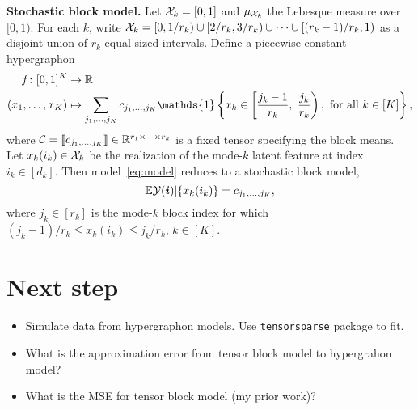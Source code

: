 \documentclass[11pt]{article}
\theoremstyle{plain}
\theoremstyle{definition}
\begin{document}
{\bf Stochastic block model.} Let $\mathcal{X}_k=[0,1]$ and $\mu_{\mathcal{X}_k}$ the Lebesque measure over $[0,1)$. For each $k$, write $\mathcal{X}_k=[0,1/r_k)\cup [2/r_k, 3/r_k) \cup \cdots \cup [(r_k-1)/r_k, 1)$ as a disjoint union of $r_k$ equal-sized intervals. Define a piecewise constant hypergraphon
\begin{align}\label{eq:block}
f\colon [0,1]^K &\to \mathbb{R}\\
(x_1,\ldots,x_K) &\mapsto \sum_{j_1,\ldots,j_K} c_{j_1,\ldots,j_K} \mathds{1}\left\{x_k\in \left[{j_k-1\over r_k},\ {j_k\over r_k}\right),\ \text{for all }k\in[K]\right\},
\end{align}
where $\mathcal{C}=\llbracket c_{j_1,\ldots,j_K} \rrbracket\in\mathbb{R}^{r_1\times \cdots \times r_k}$ is a fixed tensor specifying the block means. Let $x_k(i_k)\in\mathcal{X}_k$ be the realization of the mode-$k$ latent feature at index $i_k\in[d_k]$. Then model~\eqref{eq:model} reduces to a stochastic block model,
\begin{equation}\label{eq:tbm}
\mathbb{E}\mathcal{Y}(\bm{i})|\{x_k(i_k)\}=c_{j_1,\ldots,j_K},
\end{equation}
where $j_k\in[r_k]$ is the mode-$k$ block index for which $(j_k-1)/r_k \leq x_k(i_k)\leq j_k/ r_k$, $k\in[K]$.

\section{Next step}
\begin{itemize}
\item Simulate data from hypergraphon models. Use {\tt tensorsparse} package to fit. 
\item What is the approximation error from tensor block model to hypergrahon model? 
\item What is the MSE for tensor block model (my prior work)?
\end{itemize}


\end{document}

